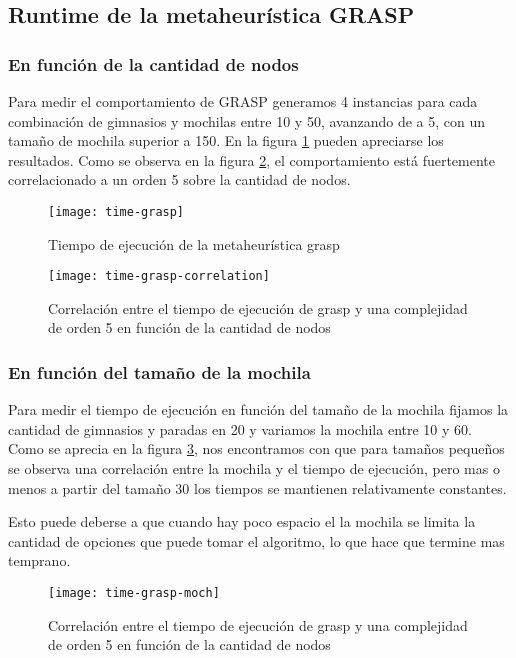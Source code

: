 \subsection{Runtime de la metaheurística GRASP}

\subsubsection{En función de la cantidad de nodos}

Para medir el comportamiento de GRASP generamos 4 instancias para cada combinación de gimnasios y mochilas entre 10 y 50, avanzando de a 5, con un tamaño de mochila superior a 150. En la figura \ref{fig:time-grasp} pueden apreciarse los resultados. Como se observa en la figura \ref{fig:time-grasp-correlation}, el comportamiento está fuertemente correlacionado a un orden 5 sobre la cantidad de nodos.

\begin{figure}[H]
	\centering
	\texttt{[image: time-grasp]}
	\caption{Tiempo de ejecución de la metaheurística grasp}
	\label{fig:time-grasp}
\end{figure}

\begin{figure}[H]
	\centering
	\texttt{[image: time-grasp-correlation]}
	\caption{Correlación entre el tiempo de ejecución de grasp y una complejidad de orden 5 en función de la cantidad de nodos}
	\label{fig:time-grasp-correlation}
\end{figure}

\subsubsection{En función del tamaño de la mochila}

Para medir el tiempo de ejecución en función del tamaño de la mochila fijamos la cantidad de gimnasios y paradas en 20 y variamos la mochila entre 10 y 60. Como se aprecia en la figura \ref{fig:time-grasp-moch}, nos encontramos con que para tamaños pequeños se observa una correlación entre la mochila y el tiempo de ejecución, pero mas o menos a partir del tamaño 30 los tiempos se mantienen relativamente constantes.

Esto puede deberse a que cuando hay poco espacio el la mochila se limita la cantidad de opciones que puede tomar el algoritmo, lo que hace que termine mas temprano.

\begin{figure}[H]
	\centering
	\texttt{[image: time-grasp-moch]}
	\caption{Correlación entre el tiempo de ejecución de grasp y una complejidad de orden 5 en función de la cantidad de nodos}
	\label{fig:time-grasp-moch}
\end{figure}
